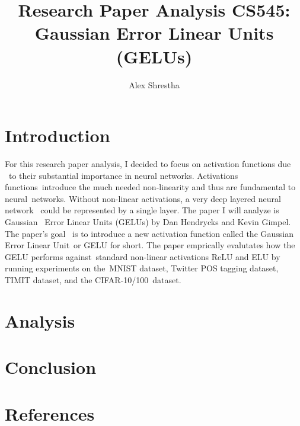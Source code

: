\documentclass[12pt]{article}
\title{Research Paper Analysis CS545: Gaussian Error Linear Units (GELUs)}
\author{Alex Shrestha}
\date{ }
\begin{document}
\maketitle

\section{Introduction}
For this research paper analysis, I decided to focus on activation functions due \
to their substantial importance in neural networks. Activations functions\ 
introduce the much needed non-linearity and thus are fundamental to neural\
networks. Without non-linear activations, a very deep layered neural network \
could be represented by a single layer. The paper I will analyze is Gaussian \
Error Linear Units (GELUs) by Dan Hendrycks and Kevin Gimpel. The paper's goal \
is to introduce a new activation function called the Gaussian Error Linear Unit\
or GELU for short. The paper emprically evalutates how the GELU performs against\
standard non-linear activations ReLU and ELU by running experiments on the\
MNIST dataset, Twitter POS tagging dataset, TIMIT dataset, and the CIFAR-10/100\
dataset. 

\section{Analysis}


\section{Conclusion}


\section{References}
\end{document}
